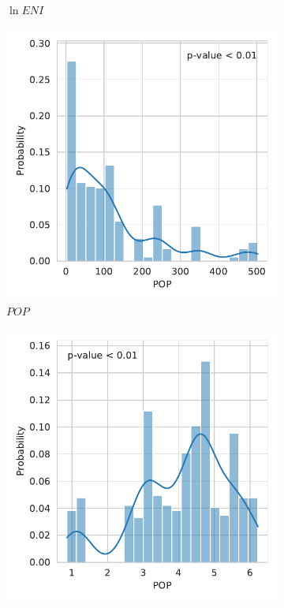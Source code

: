\documentclass[12pt,a4paper]{article}
\begin{document}
\begin{figure}[htbp]
\begin{subfigure}{0.45\textwidth}
\caption{$\ln ENI$}
\end{subfigure}
\begin{subfigure}{0.45\textwidth}
\includegraphics[width=\textwidth]{./plots/dis/distplot_POP.pdf}
\caption{$POP$}
\end{subfigure}
\begin{subfigure}{0.45\textwidth}
\includegraphics[width=\textwidth]{./plots/dis/distplot_lnPOP.pdf}

\end{subfigure}
\end{figure}
\end{document}
